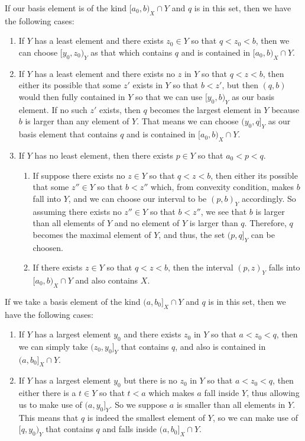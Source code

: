 \documentclass[main.tex]{subfiles}
\begin{document}
{\begin{enumerate}
\end{enumerate}
If our basis element is of the kind $[a_0,b)_X \cap Y$ and $q$ is in this set, then we have the following cases:
\begin{enumerate}
    \item If $Y$ has a least element and there exists $z_0\in Y$ so that $q<z_0<b$, then we can choose $[y_0,z_0)_Y$ as that which contains $q$ and is contained in $[a_0,b)_X \cap Y$.
    \item If $Y$ has a least element and there exists no $z$ in $Y$ so that $q<z<b$, then either its possible that some $z'$ exists in $Y$ so that $b<z'$, but then $(q,b)$ would then fully contained in $Y$ so that we can use $[y_0,b)_Y$ as our basis element. If no such $z'$ exists, then $q$ becomes the largest element in $Y$ because $b$ is larger than any element of $Y$. That means we can choose $(y_0,q]_Y$ as our basis element that contains $q$ and is contained in $[a_0,b)_X \cap Y$.
    \item If $Y$ has no least element, then there exists $p \in Y$ so that $a_0<p<q$. \begin{enumerate}
        \item If suppose there exists no $z \in Y$ so that $q<z<b$, then either its possible that some $z'' \in Y$ so that $b<z''$ which, from convexity condition, makes $b$ fall into $Y$, and we can choose our interval to be $(p,b)_Y$ accordingly. So assuming there exists no $z'' \in Y$ so that $b<z''$, we see that $b$ is larger than all elements of $Y$ and no element of $Y$ is larger than $q$. Therefore, $q$ becomes the maximal element of $Y$, and thus, the set $(p,q]_Y$ can be choosen.
        \item If there exists $z \in Y$ so that $q<z<b$, then the interval $(p,z)_Y$ falls into $[a_0,b)_X \cap Y$ and also contains $X$. 
    \end{enumerate}
\end{enumerate}
If we take a basis element of the kind $(a,b_0]_X \cap Y$ and $q$ is in this set, then we have the following cases:
\begin{enumerate}
    \item If $Y$ has a largest element $y_0$ and there exists $z_0$ in $Y$ so that $a<z_0<q$, then we can simply take $(z_0,y_0]_Y$ that contains $q$, and also is contained in $(a,b_0]_X \cap Y$. 
    \item If $Y$ has a largest element $y_0$ but there is no $z_0$ in $Y$ so that $a<z_0<q$, then either there is a $t \in Y$ so that $t<a$ which makes $a$ fall inside $Y$, thus allowing us to make use of $(a,y_0]_Y$. So we suppose $a$ is smaller than all elements in $Y$. This means that $q$ is indeed the smallest element of $Y$, so we can make use of $[q,y_0)_Y$ that contains $q$ and falls inside $(a,b_0]_X \cap Y$.

\end{enumerate}}
\end{document}
